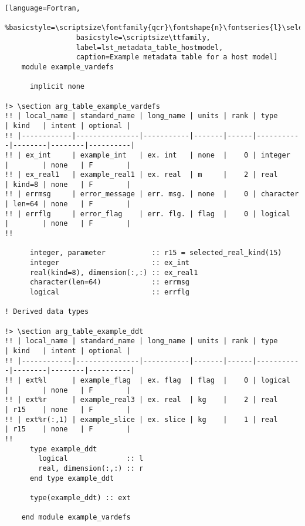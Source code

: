 \begin{sidewaysfigure}
\begin{lstlisting}[language=Fortran,
                 %basicstyle=\scriptsize\fontfamily{qcr}\fontshape{n}\fontseries{l}\selectfont
                 basicstyle=\scriptsize\ttfamily,
                 label=lst_metadata_table_hostmodel,
                 caption=Example metadata table for a host model]
    module example_vardefs

      implicit none

!> \section arg_table_example_vardefs
!! | local_name | standard_name | long_name | units | rank | type      | kind   | intent | optional |
!! |------------|---------------|-----------|-------|------|-----------|--------|--------|----------|
!! | ex_int     | example_int   | ex. int   | none  |    0 | integer   |        | none   | F        |
!! | ex_real1   | example_real1 | ex. real  | m     |    2 | real      | kind=8 | none   | F        |
!! | errmsg     | error_message | err. msg. | none  |    0 | character | len=64 | none   | F        |
!! | errflg     | error_flag    | err. flg. | flag  |    0 | logical   |        | none   | F        |
!!

      integer, parameter           :: r15 = selected_real_kind(15)
      integer                      :: ex_int
      real(kind=8), dimension(:,:) :: ex_real1
      character(len=64)            :: errmsg
      logical                      :: errflg

! Derived data types

!> \section arg_table_example_ddt
!! | local_name | standard_name | long_name | units | rank | type      | kind   | intent | optional |
!! |------------|---------------|-----------|-------|------|-----------|--------|--------|----------|
!! | ext%l      | example_flag  | ex. flag  | flag  |    0 | logical   |        | none   | F        |
!! | ext%r      | example_real3 | ex. real  | kg    |    2 | real      | r15    | none   | F        |
!! | ext%r(:,1) | example_slice | ex. slice | kg    |    1 | real      | r15    | none   | F        |
!!
      type example_ddt
        logical              :: l
        real, dimension(:,:) :: r
      end type example_ddt

      type(example_ddt) :: ext

    end module example_vardefs
\end{lstlisting}
\end{sidewaysfigure}

